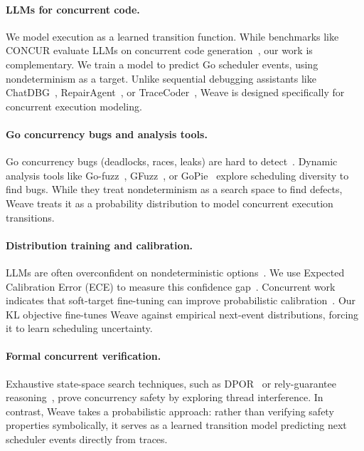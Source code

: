 \documentclass[10pt,conference]{IEEEtran}
\begin{document}
\paragraph{LLMs for concurrent code.}
We model execution as a learned transition function. While benchmarks like CONCUR evaluate LLMs on concurrent code generation~\cite{concur,jainpurandare}, our work is complementary. We train a model to predict Go scheduler events, using nondeterminism as a target. Unlike sequential debugging assistants like ChatDBG~\cite{davis2024chatdbg}, RepairAgent~\cite{bouzenia2025repairagent}, or TraceCoder~\cite{tracecoder}, Weave is designed specifically for concurrent execution modeling.

\paragraph{Go concurrency bugs and analysis tools.}
Go concurrency bugs (deadlocks, races, leaks) are hard to detect~\cite{goker}. Dynamic analysis tools like Go-fuzz~\cite{vyukov2015gofuzz}, GFuzz~\cite{gfuzz}, or GoPie~\cite{gopie} explore scheduling diversity to find bugs. While they treat nondeterminism as a search space to find defects, Weave treats it as a probability distribution to model concurrent execution transitions.

\paragraph{Distribution training and calibration.}
LLMs are often overconfident on nondeterministic options~\cite{diffuse}. We use Expected Calibration Error (ECE) to measure this confidence gap~\cite{guocalib,spiess}. Concurrent work indicates that soft-target fine-tuning can improve probabilistic calibration~\cite{probcalib}. Our KL objective fine-tunes Weave against empirical next-event distributions, forcing it to learn scheduling uncertainty.

\paragraph{Formal concurrent verification.}
Exhaustive state-space search techniques, such as DPOR~\cite{flanagan2005dynamic,flanagan2002} or rely-guarantee reasoning~\cite{Jones1983,Lipton1975}, prove concurrency safety by exploring thread interference. In contrast, Weave takes a probabilistic approach: rather than verifying safety properties symbolically, it serves as a learned transition model predicting next scheduler events directly from traces.
\end{document}
